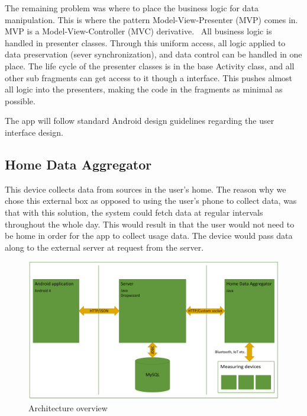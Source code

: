 The remaining problem was where to place the business logic for data manipulation. This is where the pattern Model-View-Presenter (MVP) comes in. MVP is a Model-View-Controller (MVC) derivative.~\cite{mvc} All business logic is handled in presenter classes. Through this uniform access, all logic applied to data preservation (sever synchronization), and data control can be handled in one place. The life cycle of the presenter classes is in the base Activity class, and all other sub fragments can get access to it though a interface. This pushes almost all logic into the presenters, making the code in the fragments as minimal as possible.

The app will follow standard Android design guidelines regarding the user interface design.

\subsection{Home Data Aggregator}
This device collects data from sources in the user's home. The reason why we chose this external box as opposed to using the user's phone to collect data, was that with this solution, the system could fetch data at regular intervals throughout the whole day. This would result in that the user would not need to be home in order for the app to collect 
usage data. The device would pass data along to the external server at request from the server.

\begin{figure}[H]
\includegraphics[width=\textwidth]{ch/architecture/fig/architecture.png}
\caption{Architecture overview}
\end{figure}
